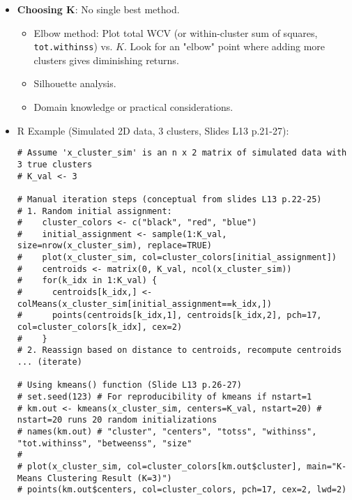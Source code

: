 \documentclass[12pt,a4paper]{article}
\newcommand{\Rcode}[1]{\texttt{#1}} %
\begin{document}
\begin{itemize}
            \item \textbf{Choosing K}: No single best method.
                \begin{itemize}
                    \item Elbow method: Plot total WCV (or within-cluster sum of squares, \Rcode{tot.withinss}) vs. $K$. Look for an "elbow" point where adding more clusters gives diminishing returns.
                    \item Silhouette analysis.
                    \item Domain knowledge or practical considerations.
                \end{itemize}
            \item R Example (Simulated 2D data, 3 clusters, Slides L13 p.21-27):
\begin{lstlisting}[caption={K-Means Clustering in R (Slides L13 p.22, 26-27)}]
# Assume 'x_cluster_sim' is an n x 2 matrix of simulated data with 3 true clusters
# K_val <- 3

# Manual iteration steps (conceptual from slides L13 p.22-25)
# 1. Random initial assignment:
#    cluster_colors <- c("black", "red", "blue")
#    initial_assignment <- sample(1:K_val, size=nrow(x_cluster_sim), replace=TRUE)
#    plot(x_cluster_sim, col=cluster_colors[initial_assignment])
#    centroids <- matrix(0, K_val, ncol(x_cluster_sim))
#    for(k_idx in 1:K_val) {
#      centroids[k_idx,] <- colMeans(x_cluster_sim[initial_assignment==k_idx,])
#      points(centroids[k_idx,1], centroids[k_idx,2], pch=17, col=cluster_colors[k_idx], cex=2)
#    }
# 2. Reassign based on distance to centroids, recompute centroids ... (iterate)

# Using kmeans() function (Slide L13 p.26-27)
# set.seed(123) # For reproducibility of kmeans if nstart=1
# km.out <- kmeans(x_cluster_sim, centers=K_val, nstart=20) # nstart=20 runs 20 random initializations
# names(km.out) # "cluster", "centers", "totss", "withinss", "tot.withinss", "betweenss", "size"
#
# plot(x_cluster_sim, col=cluster_colors[km.out$cluster], main="K-Means Clustering Result (K=3)")
# points(km.out$centers, col=cluster_colors, pch=17, cex=2, lwd=2)
\end{lstlisting}
        \end{itemize}
\end{document}
